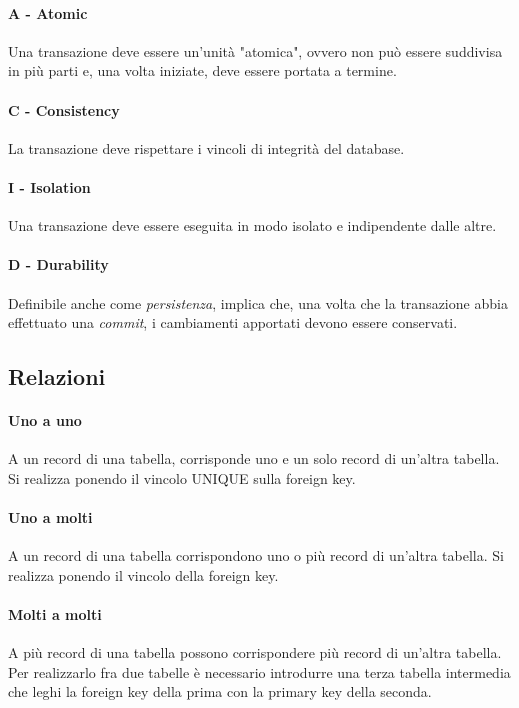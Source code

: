 \documentclass{article}
\begin{document}
        \paragraph{A - Atomic} Una transazione deve essere un'unità "atomica", ovvero non può essere suddivisa in più parti e, una volta iniziate, deve essere portata a termine.
        \paragraph{C - Consistency} La transazione deve rispettare i vincoli di integrità del database.
        \paragraph{I - Isolation} Una transazione deve essere eseguita in modo isolato e indipendente dalle altre.
        \paragraph{D - Durability} Definibile anche come \textit{persistenza}, implica che, una volta che la transazione abbia effettuato una \textit{commit}, i cambiamenti apportati devono essere conservati. 
    
    \subsection{Relazioni}
        \paragraph{Uno a uno} A un record di una tabella, corrisponde uno e un solo record di un'altra tabella. Si realizza ponendo il vincolo UNIQUE sulla foreign key.
        \paragraph{Uno a molti} A un record di una tabella corrispondono uno o più record di un'altra tabella. Si realizza ponendo il vincolo della foreign key.
        \paragraph{Molti a molti} A più record di una tabella possono corrispondere più record di un'altra tabella. Per realizzarlo fra due tabelle è necessario introdurre una terza tabella intermedia che leghi la foreign key della prima con la primary key della seconda.
    
\end{document}
